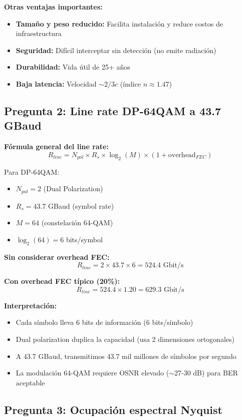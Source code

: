 \documentclass[a4paper,10pt]{article}
\begin{document}
\textbf{Otras ventajas importantes:}
\begin{itemize}
    \item \textbf{Tamaño y peso reducido:} Facilita instalación y reduce costos de infraestructura
    \item \textbf{Seguridad:} Difícil interceptar sin detección (no emite radiación)
    \item \textbf{Durabilidad:} Vida útil de 25+ años
    \item \textbf{Baja latencia:} Velocidad $\sim 2/3 c$ (índice $n \approx 1.47$)
\end{itemize}

\subsection{Pregunta 2: Line rate DP-64QAM a 43.7 GBaud}

\textbf{Fórmula general del line rate:}
$$R_{line} = N_{pol} \times R_s \times \log_2(M) \times (1 + \text{overhead}_{FEC})$$

Para DP-64QAM:
\begin{itemize}
    \item $N_{pol} = 2$ (Dual Polarization)
    \item $R_s = 43.7$ GBaud (symbol rate)
    \item $M = 64$ (constelación 64-QAM)
    \item $\log_2(64) = 6$ bits/symbol
\end{itemize}

\textbf{Sin considerar overhead FEC:}
$$R_{line} = 2 \times 43.7 \times 6 = \boxed{524.4 \text{ Gbit/s}}$$

\textbf{Con overhead FEC típico (20\%):}
$$R_{line} = 524.4 \times 1.20 = \boxed{629.3 \text{ Gbit/s}}$$

\textbf{Interpretación:}
\begin{itemize}
    \item Cada símbolo lleva 6 bits de información (6 bits/símbolo)
    \item Dual polarization duplica la capacidad (usa 2 dimensiones ortogonales)
    \item A 43.7 GBaud, transmitimos 43.7 mil millones de símbolos por segundo
    \item La modulación 64-QAM requiere OSNR elevado ($\sim$27-30 dB) para BER aceptable
\end{itemize}

\subsection{Pregunta 3: Ocupación espectral Nyquist}
\end{document}
